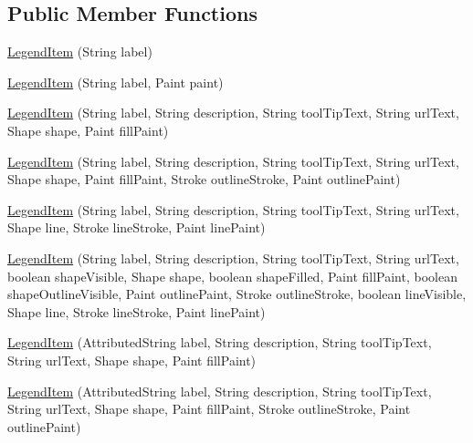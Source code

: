 \subsection*{Public Member Functions}
\begin{DoxyCompactItemize}
\item 
\mbox{\hyperlink{classorg_1_1jfree_1_1chart_1_1_legend_item_ad7669c0c3647a5a73ac057b71b88e859}{Legend\+Item}} (String label)
\item 
\mbox{\hyperlink{classorg_1_1jfree_1_1chart_1_1_legend_item_ac576714c87364482d03cff0a2ffad9d9}{Legend\+Item}} (String label, Paint paint)
\item 
\mbox{\hyperlink{classorg_1_1jfree_1_1chart_1_1_legend_item_a7c7a2eb10ea3fcbc1761e6bbac9ce5d1}{Legend\+Item}} (String label, String description, String tool\+Tip\+Text, String url\+Text, Shape shape, Paint fill\+Paint)
\item 
\mbox{\hyperlink{classorg_1_1jfree_1_1chart_1_1_legend_item_af5393c74eca16b11f7ebf4845aa1c732}{Legend\+Item}} (String label, String description, String tool\+Tip\+Text, String url\+Text, Shape shape, Paint fill\+Paint, Stroke outline\+Stroke, Paint outline\+Paint)
\item 
\mbox{\hyperlink{classorg_1_1jfree_1_1chart_1_1_legend_item_a03d979a8e55fbc909bef0c068138de93}{Legend\+Item}} (String label, String description, String tool\+Tip\+Text, String url\+Text, Shape line, Stroke line\+Stroke, Paint line\+Paint)
\item 
\mbox{\hyperlink{classorg_1_1jfree_1_1chart_1_1_legend_item_af786607d4f17ff72c61cc21e443bc790}{Legend\+Item}} (String label, String description, String tool\+Tip\+Text, String url\+Text, boolean shape\+Visible, Shape shape, boolean shape\+Filled, Paint fill\+Paint, boolean shape\+Outline\+Visible, Paint outline\+Paint, Stroke outline\+Stroke, boolean line\+Visible, Shape line, Stroke line\+Stroke, Paint line\+Paint)
\item 
\mbox{\hyperlink{classorg_1_1jfree_1_1chart_1_1_legend_item_a07bfe86095ea77f46282db6613a1abb4}{Legend\+Item}} (Attributed\+String label, String description, String tool\+Tip\+Text, String url\+Text, Shape shape, Paint fill\+Paint)
\item 
\mbox{\hyperlink{classorg_1_1jfree_1_1chart_1_1_legend_item_afa1a0e8d5c42890b9117cf693e276b97}{Legend\+Item}} (Attributed\+String label, String description, String tool\+Tip\+Text, String url\+Text, Shape shape, Paint fill\+Paint, Stroke outline\+Stroke, Paint outline\+Paint)
\item 

\end{DoxyCompactItemize}
